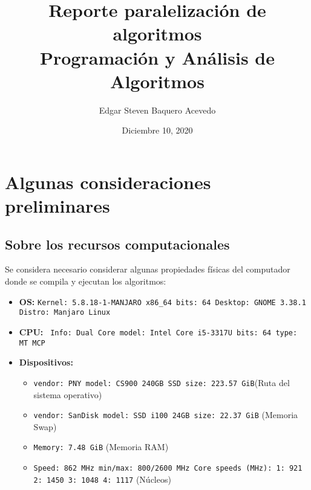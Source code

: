 \documentclass{article}\usepackage[]{graphicx}\usepackage[]{color}
\title{Reporte paralelización de algoritmos\\ Programación y Análisis de Algoritmos}
\author{Edgar Steven Baquero Acevedo}
\date{Diciembre 10, 2020}
\begin{document}
	
\maketitle

\section{Algunas consideraciones preliminares}
\subsection*{Sobre los recursos computacionales}
Se considera necesario considerar algunas propiedades físicas del computador donde se compila y ejecutan los algoritmos:
\begin{itemize}
\item 	\textbf{OS:} \texttt{Kernel: 5.8.18-1-MANJARO x86\_64 bits: 64 Desktop: GNOME 3.38.1 
	Distro: Manjaro Linux}
\item	\textbf{CPU:} \texttt{ Info: Dual Core model: Intel Core i5-3317U bits: 64 type: MT MCP}
\item	\textbf{Dispositivos:} 
\begin{itemize}
	\item \texttt{vendor: PNY model: CS900 240GB SSD size: 223.57 GiB}\linebreak(Ruta del sistema operativo)
	\item \texttt{vendor: SanDisk model: SSD i100 24GB size: 22.37 GiB} \linebreak(Memoria Swap)
	\item \texttt{Memory: 7.48 GiB} (Memoria RAM)
	\item \texttt{Speed: 862 MHz min/max: 800/2600 MHz Core speeds (MHz): 1: 921 2: 1450 
		3: 1048 4: 1117} (Núcleos)
\end{itemize}
\end{itemize}
\newpage
\end{document}
